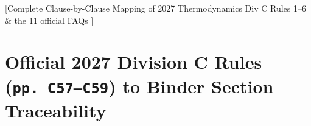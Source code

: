 \setcounter{chapter}{4}
[Complete Clause-by-Clause Mapping of 2027 Thermodynamics Div C Rules 1--6 \& the 11 official FAQs {}]

\section{Official 2027 Division C Rules (\texttt{pp.\ C57--C59}) to Binder Section Traceability}\label{app:E.1}

